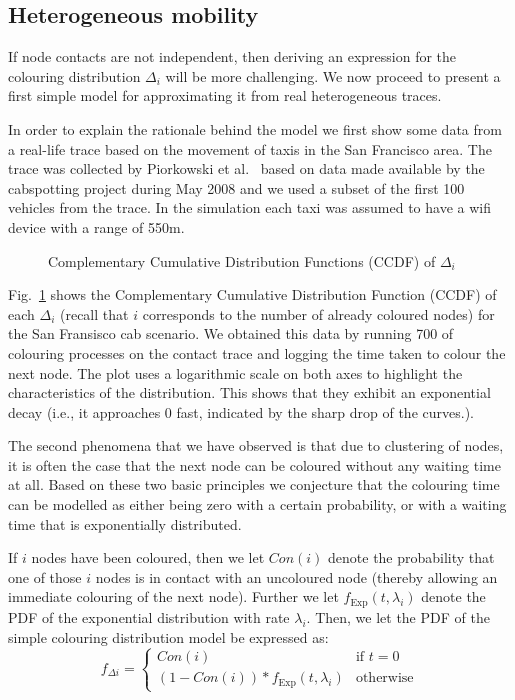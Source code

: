 \documentclass{article}
\begin{document}
\subsection{Heterogeneous mobility}
\label{sec:heterogeneous}

If node contacts are not independent, then deriving an expression for
the colouring distribution $\Delta_i$ will be more challenging. We
now proceed to present a first simple model for approximating it
from real heterogeneous traces.

In order to explain the rationale behind the model we  first show
some data from a real-life trace based on the movement of taxis in the
San Francisco area. The trace was collected by Piorkowski et
al.~\cite{piorkowski09} based on data made available by the
cabspotting project during May 2008 and we used a subset of the first
100 vehicles from the trace. In the simulation each taxi was assumed
to have a wifi device with a range of 550m.


\begin{figure}[tb]
  \centering
   \caption{Complementary Cumulative Distribution Functions (CCDF) of
     $\Delta_i$}
  \label{fig:ccdf}
\end{figure}

Fig.~\ref{fig:ccdf} shows the Complementary Cumulative Distribution
Function (CCDF) of each $\Delta_i$ (recall that $i$ corresponds to the
number of already coloured nodes) for the San Fransisco cab
scenario. We obtained this data by running 700 of colouring processes
on the contact trace and logging the time taken to colour the next
node. The plot uses a logarithmic scale on both axes to highlight the
characteristics of the distribution. This shows that they exhibit an
exponential decay (i.e., it approaches 0 fast, indicated by the sharp
drop of the curves.).

The second phenomena that we have observed is that due to clustering
of nodes, it is often the case that the next node can be coloured
without any waiting time at all. Based on these two basic principles
we conjecture that the colouring time can be modelled as either being
zero with a certain probability, or with a waiting time that is
exponentially distributed.

If $i$ nodes have been coloured, then we let $Con(i)$ denote the
probability that one of those $i$ nodes is in contact with an uncoloured
node (thereby allowing an immediate colouring of the next
node). Further we let $f_{\text{Exp}}(t,\lambda_i)$ denote the PDF of
the exponential distribution with rate $\lambda_i$. Then, we let the
PDF of the simple colouring distribution model be expressed as:
\begin{equation}
  \label{eq:colmodel}
  f_{\Delta i} =\begin{cases} Con(i) &\text{if } t=0\\
    (1-Con(i))*f_{\text{Exp}}(t,\lambda_i) &\text{otherwise}
    \end{cases}
\end{equation}
\end{document}
